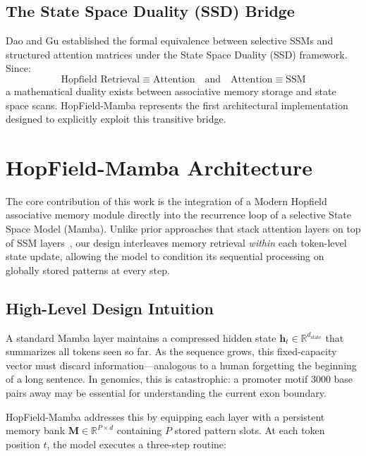 \documentclass[journal,10pt]{IEEEtran}
\newcommand{\R}{\mathbb{R}}
\begin{document}
\subsection{The State Space Duality (SSD) Bridge}
Dao and Gu established the formal equivalence between selective SSMs and structured attention matrices under the State Space Duality (SSD) framework. Since:
\begin{equation}
    \text{Hopfield Retrieval} \equiv \text{Attention} \quad \text{and} \quad \text{Attention} \equiv \text{SSM}
\end{equation}
a mathematical duality exists between associative memory storage and state space scans. HopField-Mamba represents the first architectural implementation designed to explicitly exploit this transitive bridge.

\section{HopField-Mamba Architecture}
\label{sec:architecture}

The core contribution of this work is the integration of a Modern Hopfield associative memory module directly into the recurrence loop of a selective State Space Model (Mamba). Unlike prior approaches that stack attention layers on top of SSM layers~\cite{dao2024transformers}, our design interleaves memory retrieval \textit{within} each token-level state update, allowing the model to condition its sequential processing on globally stored patterns at every step.

\subsection{High-Level Design Intuition}

A standard Mamba layer maintains a compressed hidden state $\bm{h}_t \in \R^{d_{\text{state}}}$ that summarizes all tokens seen so far. As the sequence grows, this fixed-capacity vector must discard information---analogous to a human forgetting the beginning of a long sentence. In genomics, this is catastrophic: a promoter motif 3000 base pairs away may be essential for understanding the current exon boundary.

HopField-Mamba addresses this by equipping each layer with a persistent memory bank $\bm{M} \in \R^{P \times d}$ containing $P$ stored pattern slots. At each token position $t$, the model executes a three-step routine:
\end{document}
